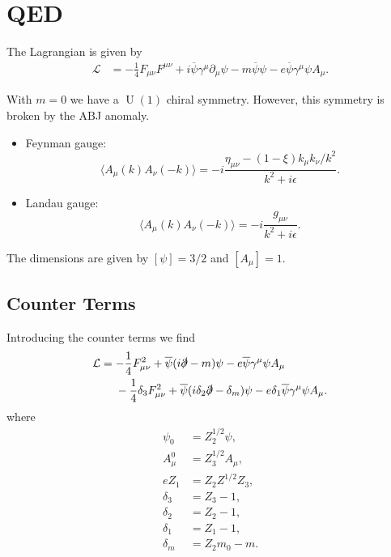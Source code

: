 \documentclass{article}
\begin{document}
\section{QED}

The Lagrangian is given by
\begin{align*}
    \mathcal{L} &= -\frac{1}{4} F_{\mu\nu} F^{\mu\nu} + i\overline{\psi} \gamma^\mu \partial_\mu \psi - m\overline{\psi}\psi - e\overline{\psi}\gamma^\mu \psi A_\mu.
\end{align*}

With $m=0$ we have a $\operatorname{U}(1)$ chiral symmetry.
However, this symmetry is broken by the ABJ anomaly.

\begin{itemize}
    \item Feynman gauge:
    \[ \langle A_\mu(k) A_\nu(-k) \rangle = -i \frac{\eta_{\mu\nu} - (1-\xi)k_\mu k_\nu / k^2}{k^2 + i\epsilon}. \]
    \item Landau gauge:
    \[ \langle A_\mu(k) A_\nu(-k) \rangle = -i\frac{g_{\mu\nu}}{k^2 + i\epsilon}. \]
\end{itemize}

The dimensions are given by $[\psi] = 3/2$ and $[A_\mu] = 1$.

\subsection{Counter Terms}

Introducing the counter terms we find
\begin{align*}
    \mathcal{L} &= -\frac{1}{4} F_{\mu\nu}^2 + \overline{\psi}(i\slashed{\partial} - m)\psi - e\overline{\psi}\gamma^\mu \psi A_\mu \\
    &{\phantom{{}={}}} -\frac{1}{4}\delta_3 F^2_{\mu\nu} + \overline{\psi}(i\delta_2 \slashed{\partial} - \delta_m) \psi - e\delta_1 \overline{\psi} \gamma^\mu \psi A_\mu.
\end{align*}
where
\begin{align*}
    \psi_0 &= Z^{1/2}_{2} \psi, \\
    A_\mu^0 &= Z^{1/2}_3 A_\mu, \\
    eZ_1 &= Z_2 Z^{1/2}Z_3,\\
    \delta_3 &= Z_3 - 1,\\
    \delta_2 &= Z_2 - 1,\\
    \delta_1 &= Z_1 - 1,\\
    \delta_m &= Z_2 m_0 - m.
\end{align*}
\end{document}

